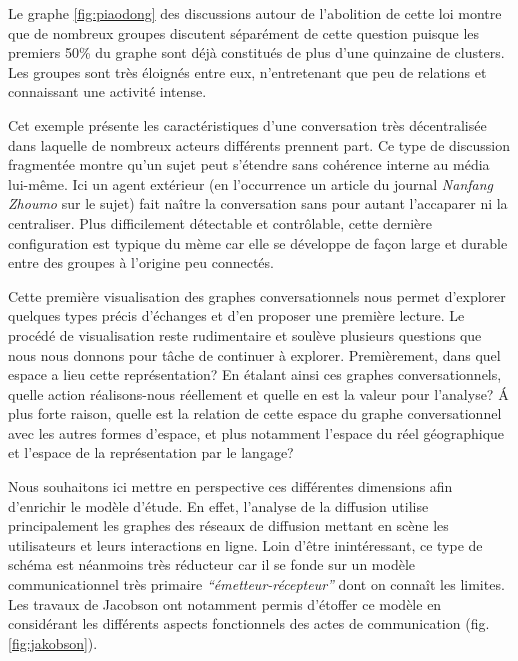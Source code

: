 Le graphe \ref{fig:piaodong} des discussions autour de l{\textquoteright}abolition de cette loi montre que de nombreux groupes discutent séparément de cette question puisque les premiers 50\% du graphe sont déjà constitués de plus d{\textquoteright}une quinzaine de clusters. Les groupes sont très éloignés entre eux, n{\textquoteright}entretenant que peu de relations et connaissant une activité intense.


Cet exemple présente les caractéristiques d{\textquoteright}une conversation très décentralisée dans laquelle de nombreux acteurs différents prennent part. Ce type de discussion fragmentée montre qu{\textquoteright}un sujet peut s{\textquoteright}étendre sans cohérence interne au média lui-m\^eme. Ici un agent extérieur (en l{\textquoteright}occurrence un article du journal \textit{Nanfang Zhoumo }sur le sujet) fait na\^itre la conversation sans pour autant l{\textquoteright}accaparer ni la centraliser. Plus difficilement détectable et contr\^olable, cette dernière configuration est typique du mème car elle se développe de fa\c{c}on large et durable entre des groupes à l{\textquoteright}origine peu connectés.

Cette première visualisation des graphes conversationnels nous permet d{\textquoteright}explorer quelques types précis d{\textquoteright}échanges et d{\textquoteright}en proposer une première lecture. Le procédé de visualisation reste rudimentaire et soulève plusieurs questions que nous nous donnons pour t\^ache de continuer à explorer. Premièrement, dans quel espace a lieu cette représentation? En étalant ainsi ces graphes conversationnels, quelle action réalisons-nous réellement et quelle en est la valeur pour l{\textquoteright}analyse? \'A plus forte raison, quelle est la relation de cette espace du graphe conversationnel avec les autres formes d{\textquoteright}espace, et plus notamment l{\textquoteright}espace du réel géographique et l{\textquoteright}espace de la représentation par le langage?

Nous souhaitons ici mettre en perspective ces différentes dimensions afin d{\textquoteright}enrichir le modèle d{\textquoteright}étude. En effet, l{\textquoteright}analyse de la diffusion utilise principalement les graphes des réseaux de diffusion mettant en scène les utilisateurs et leurs interactions en ligne. Loin d{\textquoteright}\^etre inintéressant, ce type de schéma est néanmoins très réducteur car il se fonde sur un modèle communicationnel très primaire \textit{{\textquotedblleft}émetteur-récepteur{\textquotedblright} }dont on conna\^it les limites. Les travaux de Jacobson ont notamment permis d{\textquoteright}étoffer ce modèle en considérant les différents aspects fonctionnels des actes de communication (fig. \ref{fig:jakobson}).


